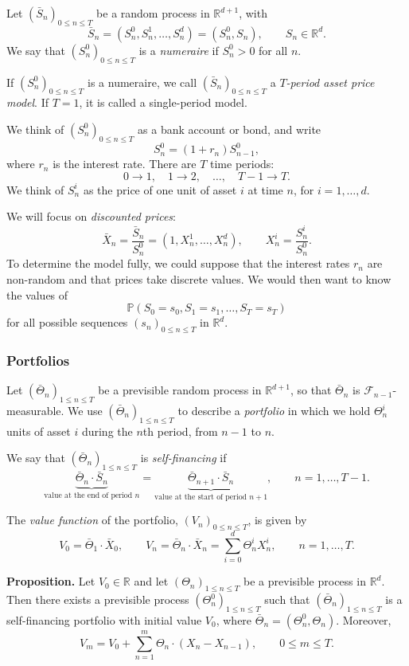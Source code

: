 \documentclass[11pt,a4paper]{article}
\begin{document}
Let $(\bar S_n)_{0\leq n\leq T}$ be a random process in
$\mathbb{R}^{d+1}$, with
\[
\bar S_n=(S_n^0,S_n^1,\ldots,S_n^d)=(S_n^0,S_n),
\qquad S_n\in\mathbb{R}^d.
\]
We say that $(S_n^0)_{0\leq n\leq T}$ is a \emph{numeraire} if
$S_n^0>0$ for all $n$.

If $(S_n^0)_{0\leq n\leq T}$ is a numeraire, we call
$(\bar S_n)_{0\leq n\leq T}$ a \emph{$T$-period asset price model}.
If $T=1$, it is called a single-period model.

We think of $(S_n^0)_{0\leq n\leq T}$ as a bank account or bond, and write
\[
S_n^0=(1+r_n)S_{n-1}^0,
\]
where $r_n$ is the interest rate.
There are $T$ time periods:
\[
0\longrightarrow1,\quad 1\longrightarrow2,\quad\ldots,\quad
T-1\longrightarrow T.
\]
We think of $S_n^i$ as the price of one unit of asset $i$ at time $n$,
for $i=1,\ldots,d$.

We will focus on \emph{discounted prices}:
\[
\bar X_n=\frac{\bar S_n}{S_n^0}
=(1,X_n^1,\ldots,X_n^d),
\qquad
X_n^i=\frac{S_n^i}{S_n^0}.
\]
To determine the model fully, we could suppose that the interest rates
$r_n$ are non-random and that prices take discrete values. We would then
want to know the values of
\[
\mathbb{P}(S_0=s_0,S_1=s_1,\ldots,S_T=s_T)
\]
for all possible sequences $(s_n)_{0\leq n\leq T}$ in $\mathbb{R}^d$.

\subsubsection*{Portfolios}

Let $(\bar\Theta_n)_{1\leq n\leq T}$ be a previsible random process in
$\mathbb{R}^{d+1}$, so that $\bar\Theta_n$ is
$\mathcal{F}_{n-1}$-measurable.
We use $(\bar\Theta_n)_{1\leq n\leq T}$ to describe a \emph{portfolio}
in which we hold $\Theta_n^i$ units of asset $i$ during the $n$th period,
from $n-1$ to $n$.

We say that $(\bar\Theta_n)_{1\leq n\leq T}$ is \emph{self-financing} if
\[
\underbrace{\bar\Theta_n\cdot\bar S_n}_{\text{value at the end of period }n}
=
\underbrace{\bar\Theta_{n+1}\cdot\bar S_n}_{\text{value at the start of period }n+1},
\qquad n=1,\ldots,T-1.
\]

The \emph{value function} of the portfolio, $(V_n)_{0\leq n\leq T}$,
is given by
\[
V_0=\bar\Theta_1\cdot\bar X_0,
\qquad
V_n=\bar\Theta_n\cdot\bar X_n
=\sum_{i=0}^{d}\Theta_n^i X_n^i,
\qquad n=1,\ldots,T.
\]

\medskip

\noindent\textbf{Proposition.}
Let $V_0\in\mathbb{R}$ and let $(\Theta_n)_{1\leq n\leq T}$ be a
previsible process in $\mathbb{R}^d$.
Then there exists a previsible process $(\Theta_n^0)_{1\leq n\leq T}$
such that $(\bar\Theta_n)_{1\leq n\leq T}$ is a self-financing portfolio
with initial value $V_0$, where $\bar\Theta_n=(\Theta_n^0,\Theta_n)$.
Moreover,
\[
V_m=V_0+\sum_{n=1}^{m}\Theta_n\cdot(X_n-X_{n-1}),
\qquad 0\leq m\leq T.
\]
\end{document}
